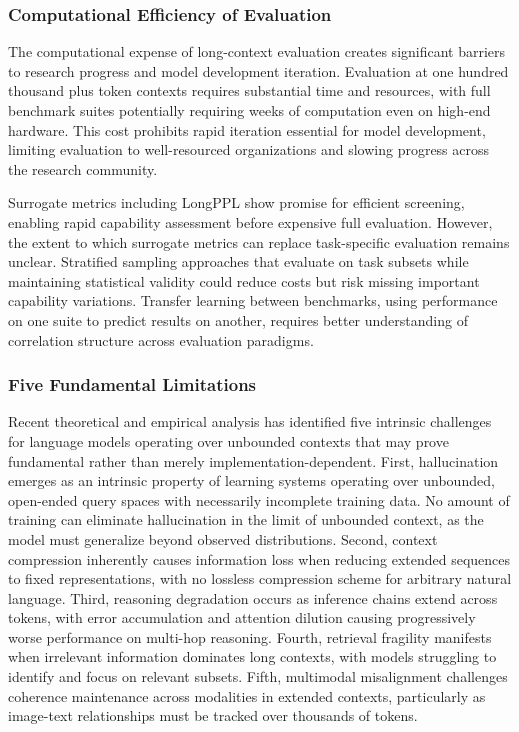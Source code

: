 \subsubsection{Computational Efficiency of Evaluation}

The computational expense of long-context evaluation creates significant barriers to research progress and model development iteration. Evaluation at one hundred thousand plus token contexts requires substantial time and resources, with full benchmark suites potentially requiring weeks of computation even on high-end hardware. This cost prohibits rapid iteration essential for model development, limiting evaluation to well-resourced organizations and slowing progress across the research community.

Surrogate metrics including LongPPL show promise for efficient screening, enabling rapid capability assessment before expensive full evaluation. However, the extent to which surrogate metrics can replace task-specific evaluation remains unclear. Stratified sampling approaches that evaluate on task subsets while maintaining statistical validity could reduce costs but risk missing important capability variations. Transfer learning between benchmarks, using performance on one suite to predict results on another, requires better understanding of correlation structure across evaluation paradigms.

\subsubsection{Five Fundamental Limitations}

Recent theoretical and empirical analysis has identified five intrinsic challenges for language models operating over unbounded contexts that may prove fundamental rather than merely implementation-dependent. First, hallucination emerges as an intrinsic property of learning systems operating over unbounded, open-ended query spaces with necessarily incomplete training data. No amount of training can eliminate hallucination in the limit of unbounded context, as the model must generalize beyond observed distributions. Second, context compression inherently causes information loss when reducing extended sequences to fixed representations, with no lossless compression scheme for arbitrary natural language. Third, reasoning degradation occurs as inference chains extend across tokens, with error accumulation and attention dilution causing progressively worse performance on multi-hop reasoning. Fourth, retrieval fragility manifests when irrelevant information dominates long contexts, with models struggling to identify and focus on relevant subsets. Fifth, multimodal misalignment challenges coherence maintenance across modalities in extended contexts, particularly as image-text relationships must be tracked over thousands of tokens.

